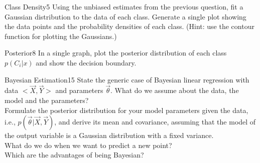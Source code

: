 \begin{questions}

\begin{question}{Class Density}{5}
Using the unbiased estimates from the previous question, fit a Gaussian distribution to the data of each class. Generate a single plot showing the data points and the probability densities of each class.
(Hint: use the contour function for plotting the Gaussians.) 

\begin{answer}\end{answer}

\end{question}


\begin{question}{Posterior}{8}
In a single graph, plot the posterior distribution of each class $p(C_i|x)$ and show the decision boundary. 

\begin{answer}\end{answer}

\end{question}


\begin{question}[bonus]{Bayesian Estimation}{15}
State the generic case of Bayesian linear regression with data $<\vec X, \vec Y>$ and parameters $\vec \theta$. What do we assume about the data, the model and the parameters?\\
Formulate the posterior distribution for your model parameters given the data, i.e., $p(\vec \theta | \vec X, \vec Y)$, and derive its mean and covariance, assuming that the model of the output variable is a Gaussian distribution with a fixed variance.\\
What do we do when we want to predict a new point?\\
Which are the advantages of being Bayesian? 

\begin{answer}\end{answer}

\end{question}

\end{questions}
